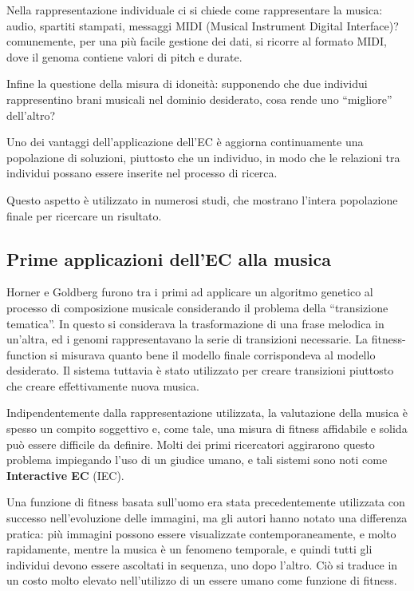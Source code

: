 \documentclass[a4paper,12pt]{report}
\begin{document}
Nella rappresentazione individuale ci si chiede come rappresentare la musica: audio, spartiti stampati, messaggi MIDI (Musical Instrument Digital Interface)? 
comunemente, per una più facile gestione dei dati, si ricorre al formato MIDI, dove il genoma contiene valori di pitch e durate. 

Infine la questione della misura di idoneità: supponendo che due individui rappresentino brani musicali nel dominio desiderato, cosa rende uno “migliore” dell’altro? 

Uno dei vantaggi dell'applicazione dell'EC è aggiorna continuamente una popolazione di soluzioni, piuttosto che un individuo, in modo che le relazioni tra individui possano essere inserite nel processo di ricerca. 

Questo aspetto è utilizzato in numerosi studi, che mostrano l'intera popolazione finale per ricercare un risultato. 

\subsection{Prime applicazioni dell'EC alla musica}

Horner e Goldberg furono tra i primi ad applicare un algoritmo genetico al processo di composizione musicale considerando il problema della “transizione tematica”. 
In questo si considerava la trasformazione di una frase melodica in un'altra, ed i genomi rappresentavano la serie di transizioni necessarie. 
La fitness-function si misurava quanto bene il modello finale corrispondeva al modello desiderato. 
Il sistema tuttavia è stato utilizzato per creare transizioni piuttosto che creare effettivamente nuova musica. 

Indipendentemente dalla rappresentazione utilizzata, la valutazione della musica è spesso un compito soggettivo e, come tale, una misura di fitness affidabile e solida può essere difficile da definire. 
Molti dei primi ricercatori aggirarono questo problema impiegando l'uso di un giudice umano, e tali sistemi sono noti come \textbf{Interactive EC} (IEC). 

Una funzione di fitness basata sull’uomo era stata precedentemente utilizzata con successo nell’evoluzione delle immagini, ma gli autori hanno notato una differenza pratica: più immagini possono essere visualizzate contemporaneamente, e molto rapidamente, 
mentre la musica è un fenomeno temporale, e quindi tutti gli individui devono essere ascoltati in sequenza, uno dopo l'altro. 
Ciò si traduce in un costo molto elevato nell’utilizzo di un essere umano come funzione di fitness.
\end{document}
